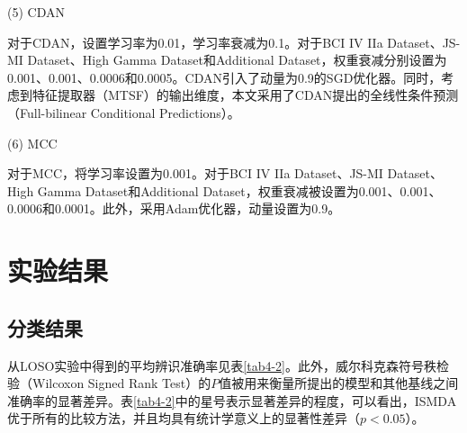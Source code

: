 (5) CDAN

对于CDAN，设置学习率为0.01，学习率衰减为0.1。对于BCI IV IIa Dataset、JS-MI Dataset、High Gamma Dataset和Additional Dataset，权重衰减分别设置为0.001、0.001、0.0006和0.0005。CDAN引入了动量为0.9的SGD优化器。同时，考虑到特征提取器（MTSF）的输出维度，本文采用了CDAN提出的全线性条件预测（Full-bilinear Conditional Predictions）。

(6) MCC

对于MCC，将学习率设置为0.001。对于BCI IV IIa Dataset、JS-MI Dataset、High Gamma Dataset和Additional Dataset，权重衰减被设置为0.001、0.001、0.0006和0.0001。此外，采用Adam优化器，动量设置为0.9。



\section{实验结果}
\subsection{分类结果}
从LOSO实验中得到的平均辨识准确率见表\ref{tab4-2}。此外，威尔科克森符号秩检验（Wilcoxon Signed Rank Test）的$P$值被用来衡量所提出的模型和其他基线之间准确率的显著差异\cite{4-28}。表\ref{tab4-2}中的星号表示显著差异的程度，可以看出，ISMDA优于所有的比较方法，并且均具有统计学意义上的显著性差异（$p < 0.05$）。

